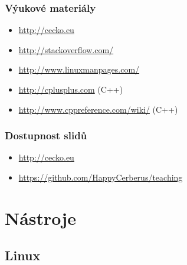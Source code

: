 \begin{frame}
	\frametitle{Výukové materiály}
	\begin{itemize}
		\item{\url{http://cecko.eu}}
		\item{\url{http://stackoverflow.com/}}
		\item{\url{http://www.linuxmanpages.com/}}
		\item{\url{http://cplusplus.com} (C++)}
		\item{\url{http://www.cppreference.com/wiki/} (C++)}
	\end{itemize}
\end{frame}

\begin{frame}
\frametitle{Dostupnost slidů}
	\begin{itemize}
		\item{\url{http://cecko.eu}}
		\item{\url{https://github.com/HappyCerberus/teaching}}
	\end{itemize}
\end{frame}

\section{Nástroje}
\subsection{Linux}

